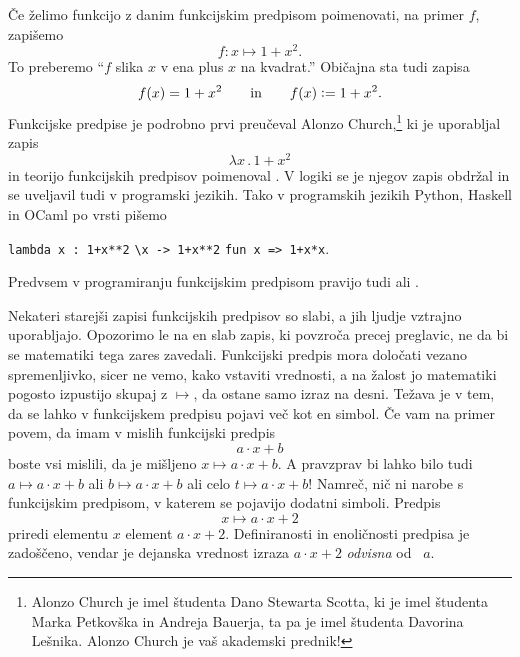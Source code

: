 Če želimo funkcijo z danim funkcijskim predpisom poimenovati, na primer $f$, zapišemo
%
\begin{equation*}
  f : x \mapsto 1 + x^2.
\end{equation*}
%
To preberemo ``$f$ slika $x$ v ena plus $x$ na kvadrat.'' Običajna sta tudi zapisa
%
\begin{equation*}
  f(x) = 1 + x^2
  \qquad\text{in}\qquad
  f(x) \mathrel{\mathop:}= 1 + x^2.
\end{equation*}
%
Funkcijske predpise je podrobno prvi preučeval Alonzo Church,\footnote{Alonzo Church je
  imel študenta Dano Stewarta Scotta, ki je imel študenta Marka Petkovška in Andreja
  Bauerja, ta pa je imel študenta Davorina Lešnika. Alonzo Church je vaš akademski
  prednik!} ki je uporabljal zapis
%
\begin{equation*}
  \lambda x \,.\, 1 + x^2
\end{equation*}
%
in teorijo funkcijskih predpisov poimenoval . V logiki se je njegov
zapis obdržal in se uveljavil tudi v programski jezikih. Tako v programskih jezikih
Python, Haskell in OCaml po vrsti pišemo
%
\begin{center}
 \verb|lambda x : 1+x**2|
 \qquad
 \verb|\x -> 1+x**2|
 \qquad
 \verb|fun x => 1+x*x|.
\end{center}
%
Predvsem v programiranju funkcijskim predpisom pravijo tudi  ali .

Nekateri starejši zapisi funkcijskih predpisov so slabi, a jih ljudje vztrajno
uporabljajo. Opozorimo le na en slab zapis, ki povzroča precej preglavic, ne da bi se
matematiki tega zares zavedali. Funkcijski predpis mora določati vezano spremenljivko,
sicer ne vemo, kako vstaviti vrednosti, a na žalost jo matematiki pogosto izpustijo skupaj
z $\mapsto$, da ostane samo izraz na desni.
%
Težava je v tem, da se lahko v funkcijskem predpisu pojavi več kot en simbol. Če vam na primer povem, da imam v mislih funkcijski predpis
%
\begin{equation*}
  a \cdot x + b
\end{equation*}
%
boste vsi mislili, da je mišljeno $x \mapsto a \cdot x + b$. A pravzprav bi lahko bilo
tudi $a \mapsto a \cdot x + b$ ali $b \mapsto a \cdot x + b$ ali celo
$t \mapsto a \cdot x + b$! Namreč, nič ni narobe s funkcijskim predpisom, v katerem se
pojavijo dodatni simboli. Predpis
%
\begin{equation*}
  x \mapsto a \cdot x + 2
\end{equation*}
%
priredi elementu $x$ element $a \cdot x + 2$. Definiranosti in enoličnosti predpisa je
zadoščeno, vendar je dejanska vrednost izraza $a \cdot x + 2$ \emph{odvisna} od
~$a$.

